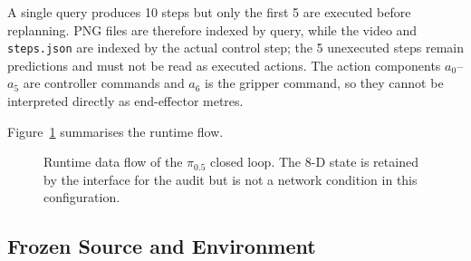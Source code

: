 A single query produces 10 steps but only the first 5 are executed before
replanning. PNG files are therefore indexed by query, while the video and
\texttt{steps.json} are indexed by the actual control step; the 5 unexecuted
steps remain predictions and must not be read as executed actions. The action
components $a_0$--$a_5$ are controller commands and $a_6$ is the gripper
command, so they cannot be interpreted directly as end-effector metres.

Figure~\ref{fig:pi05-dataflow} summarises the runtime flow.

\begin{figure}[H]
  \centering
  \caption{Runtime data flow of the $\pi_{0.5}$ closed loop. The 8-D state is
  retained by the interface for the audit but is not a network condition in
  this configuration.}
  \label{fig:pi05-dataflow}
\end{figure}

\subsection{Frozen Source and Environment}
\label{sec:pi05-env}

